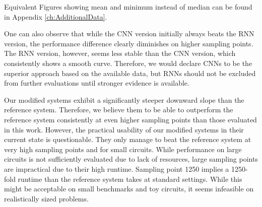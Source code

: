 Equivalent Figures showing mean and minimum instead of median can be found in Appendix \ref{ch:AdditionalData}.

One can also observe that while the \gls{CNN} version initially always beats the \gls{RNN} version, the performance difference clearly diminishes on higher sampling points. The \gls{RNN} version, however, seems less stable than the \gls{CNN} version, which consistently shows a smooth curve. Therefore, we would declare \glspl{CNN} to be the superior approach based on the available data, but \glspl{RNN} should not be excluded from further evaluations until stronger evidence is available.

Our modified systems exhibit a significantly steeper downward slope than the reference system. Therefore, we believe them to be able to outperform the reference system consistently at even higher sampling points than those evaluated in this work. However, the practical usability of our modified systems in their current state is questionable. They only manage to beat the reference system at very high sampling points and for small circuits. While performance on large circuits is not sufficiently evaluated due to lack of resources, large sampling points are impractical due to their high runtime. Sampling point 1250 implies a 1250-fold runtime than the reference system takes at standard settings. While this might be acceptable on small benchmarks and toy circuits, it seems infeasible on realistically sized problems.

